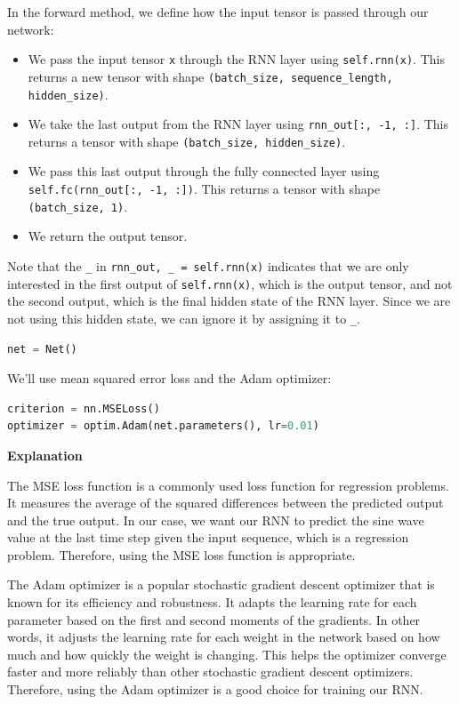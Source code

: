 In the forward method, we define how the input tensor is passed through
our network:

\begin{itemize}
\item
  We pass the input tensor \lstinline{x} through the RNN layer using \lstinline{self.rnn(x)}. This returns a new tensor with shape \lstinline{(batch_size, sequence_length, hidden_size)}.
\item
  We take the last output from the RNN layer using
  \lstinline{rnn_out[:, -1, :]}. This returns a tensor
  with shape \lstinline{(batch_size, hidden_size)}.
\item
  We pass this last output through the fully connected layer using
  \lstinline{self.fc(rnn_out[:, -1, :])}. This returns a
  tensor with shape \lstinline{(batch_size, 1)}.
\item
  We return the output tensor.
\end{itemize}

Note that the \lstinline{_} in
\lstinline{rnn_out, _ = self.rnn(x)} indicates that we
are only interested in the first output of
\lstinline{self.rnn(x)}, which is the output tensor, and
not the second output, which is the final hidden state of the RNN layer.
Since we are not using this hidden state, we can ignore it by assigning
it to \lstinline{_}.

\begin{lstlisting}[language=Python]
net = Net()
\end{lstlisting}

We'll use mean squared error loss and the Adam optimizer:

\begin{lstlisting}[language=Python]
criterion = nn.MSELoss()
optimizer = optim.Adam(net.parameters(), lr=0.01)
\end{lstlisting}

\textbf{Explanation}

The MSE loss function is a commonly used loss function for regression
problems. It measures the average of the squared differences between the
predicted output and the true output. In our case, we want our RNN to
predict the sine wave value at the last time step given the input
sequence, which is a regression problem. Therefore, using the MSE loss
function is appropriate. \newline

The Adam optimizer is a popular stochastic gradient descent optimizer
that is known for its efficiency and robustness. It adapts the learning
rate for each parameter based on the first and second moments of the
gradients. In other words, it adjusts the learning rate for each weight
in the network based on how much and how quickly the weight is changing.
This helps the optimizer converge faster and more reliably than other
stochastic gradient descent optimizers. Therefore, using the Adam
optimizer is a good choice for training our RNN. \newline

